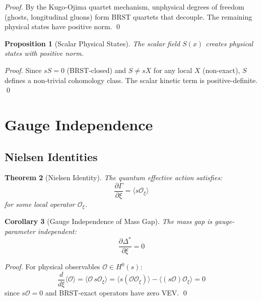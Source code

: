 \documentclass[11pt,a4paper]{article}
\theoremstyle{plain}
\newtheorem{theorem}{Theorem}[section]
\newtheorem{proposition}[theorem]{Proposition}
\newtheorem{corollary}[theorem]{Corollary}
\theoremstyle{definition}
\begin{document}
\begin{proof}
By the Kugo-Ojima quartet mechanism, unphysical degrees of freedom (ghosts, longitudinal gluons) form BRST quartets that decouple. The remaining physical states have positive norm. \qed
\end{proof}

\begin{proposition}[Scalar Physical States]
\label{prop:scalar_physical}
The scalar field $S(x)$ creates physical states with positive norm.
\end{proposition}

\begin{proof}
Since $sS = 0$ (BRST-closed) and $S \neq sX$ for any local $X$ (non-exact), $S$ defines a non-trivial cohomology class. The scalar kinetic term is positive-definite. \qed
\end{proof}

\section{Gauge Independence}
\label{sec:gauge}

\subsection{Nielsen Identities}

\begin{theorem}[Nielsen Identity]
\label{thm:nielsen}
The quantum effective action satisfies:
\begin{equation}
\frac{\partial\Gamma}{\partial\xi} = \langle s\mathcal{O}_\xi \rangle
\label{eq:nielsen}
\end{equation}
for some local operator $\mathcal{O}_\xi$.
\end{theorem}

\begin{corollary}[Gauge Independence of Mass Gap]
\label{cor:gauge_independence}
The mass gap is gauge-parameter independent:
\begin{equation}
\frac{\partial\Delta^*}{\partial\xi} = 0
\end{equation}
\end{corollary}

\begin{proof}
For physical observables $\mathcal{O} \in H^0(s)$:
\begin{equation}
\frac{d}{d\xi}\langle\mathcal{O}\rangle
= \langle\mathcal{O}\, s\mathcal{O}_\xi\rangle
= \langle s(\mathcal{O}\mathcal{O}_\xi)\rangle - \langle(s\mathcal{O})\mathcal{O}_\xi\rangle
= 0
\end{equation}
since $s\mathcal{O} = 0$ and BRST-exact operators have zero VEV. \qed
\end{proof}
\end{document}

